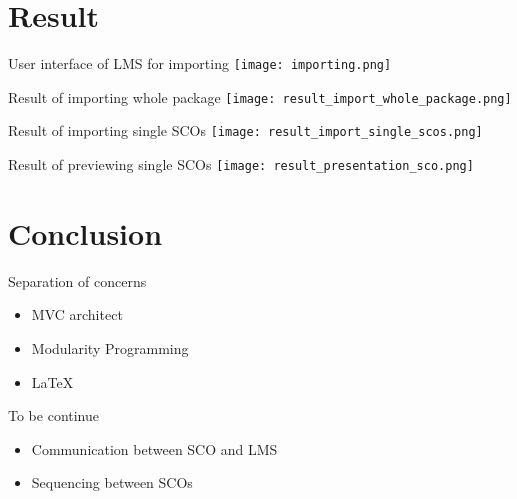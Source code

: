 \documentclass{beamer}
\begin{document}
\section{Result}
\begin{frame}{User interface of LMS for importing}
	\hspace*{-5mm}
	\texttt{[image: importing.png]}
\end{frame}
\begin{frame}{Result of importing whole package}
	\hspace*{-5mm}
	\texttt{[image: result\_import\_whole\_package.png]}
\end{frame}
\begin{frame}{Result of importing single SCOs}
	\hspace*{-5mm}
	\texttt{[image: result\_import\_single\_scos.png]}
\end{frame}
\begin{frame}{Result of previewing single SCOs}
	\hspace*{-5mm}
	\texttt{[image: result\_presentation\_sco.png]}
\end{frame}

\section{Conclusion}
\begin{frame}{Separation of concerns}
	\begin{itemize}
		\item
			\pause
			MVC architect
			\pause
		\item
			Modularity Programming
			\pause
		\item
			\LaTeX
			\pause
	\end{itemize}
\end{frame}
\begin{frame}{To be continue}
	\begin{itemize}
		\item
			Communication between SCO and LMS
			\pause
		\item
			Sequencing between SCOs
			\pause
	\end{itemize}
\end{frame}
\end{document}
